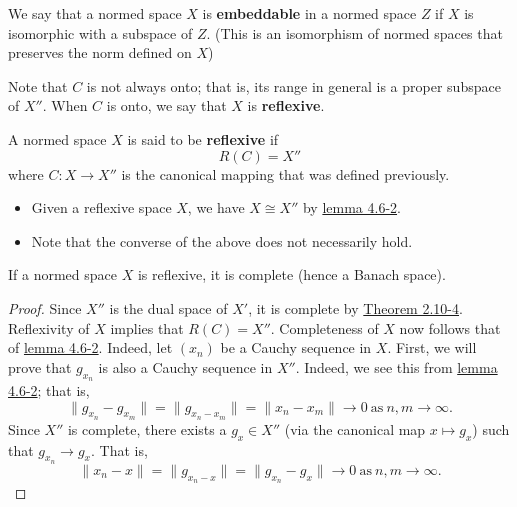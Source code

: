 \begin{definition}[Embeddable]
    We say that a normed space \( X  \) is \textbf{embeddable} in a normed space \( Z  \) if \( X  \) is isomorphic with a subspace of \( Z  \). (This is an isomorphism of normed spaces that preserves the norm defined on \( X  \))
\end{definition}

Note that \( C  \) is not always onto; that is, its range in general is a proper subspace of \( X'' \). When \( C  \) is onto, we say that \( X  \) is \textbf{reflexive}.

\begin{definition}[Reflexivity]
    A normed space \( X  \) is said to be \textbf{reflexive} if 
    \[  R(C) = X'' \]
    where \( C: X \to X'' \) is the canonical mapping that was defined previously.
\end{definition}
\begin{itemize}
    \item Given a reflexive space \( X  \), we have \( X \cong X''  \) by {\hyperref[4.6-2]{lemma 4.6-2}}. 
    \item Note that the converse of the above does not necessarily hold.
\end{itemize}

\begin{theorem}[Completeness]
    If a normed space \( X  \) is reflexive, it is complete (hence a Banach space).
\end{theorem}
\begin{proof}
    Since \( X'' \) is the dual space of \( X' \), it is complete by {\hyperref[2.10-4]{Theorem 2.10-4}}. Reflexivity of \( X  \) implies that \( R(C) = X'' \). Completeness of \( X  \) now follows that of {\hyperref[4.6-2]{lemma 4.6-2}}. Indeed, let \( ({x}_{n})  \) be a Cauchy sequence in \( X \). First, we will prove that \( {g}_{{x}_{n}}  \) is also a Cauchy sequence in \( X'' \). Indeed, we see this from {\hyperref[4.6-2]{lemma 4.6-2}}; that is,  
    \[  \|{g}_{{x}_{n}} - {g}_{{x}_{m}}\| = \|{g}_{{x}_{n} - {x}_{m}}\| = \|{x}_{n} - {x}_{m}\| \longrightarrow 0 \ \text{as} \ n,m \longrightarrow \infty.  \]
    Since \( X'' \) is complete, there exists a \( {g}_{x} \in X'' \) (via the canonical map \( x \mapsto {g}_{x} \)) such that \( {g}_{{x}_{n}} \to {g}_{x} \). That is, 
    \[  \|{x}_{n} - x\| = \|{g}_{{x}_{n} - x}\| = \|{g}_{{x}_{n}} - {g}_{x}\| \longrightarrow 0 \ \text{as} \ n,m \longrightarrow \infty. \]
\end{proof}

